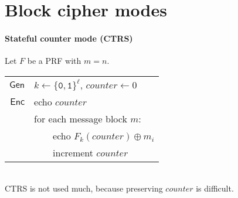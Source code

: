 \documentclass[11pt]{article}
\newcommand{\Gen}{\ensuremath{\mathsf{Gen}}}
\newcommand{\Enc}{\ensuremath{\mathsf{Enc}}}
\newcommand{\bit}{\ensuremath{\{\texttt{0},\texttt{1}\}}}
\theoremstyle{remark}
\begin{document}
\section{Block cipher modes}

\paragraph{Stateful counter mode (CTRS)}
Let $F$ be a PRF with $m = n$.
~\\[5pt]
\begin{tabular}{r|l}
\Gen & $k \leftarrow \bit^\ell$, $counter \leftarrow 0$ \\[5pt]
\Enc & echo $counter$ \\
     & for each message block $m$: \\
     & ~~~~echo $F_k(counter) \oplus m_i$ \\
     & ~~~~increment $counter$
\end{tabular}\\

CTRS is not used much, because preserving $counter$ is difficult.
\end{document}
